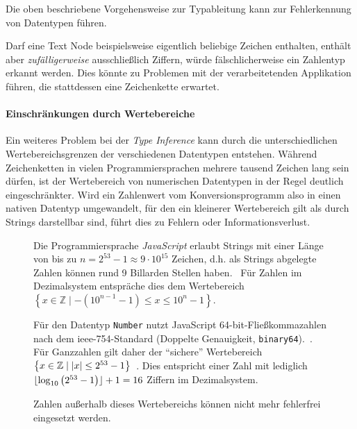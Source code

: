 Die oben beschriebene Vorgehensweise zur Typableitung kann zur Fehlerkennung von Datentypen führen.

Darf eine Text Node beispielsweise eigentlich beliebige Zeichen enthalten, enthält aber \emph{zufälligerweise} ausschließlich Ziffern, würde fälschlicherweise ein Zahlentyp erkannt werden. Dies könnte zu Problemen mit der verarbeitetenden Applikation führen, die stattdessen eine Zeichenkette erwartet.

\paragraph{Einschränkungen durch Wertebereiche}

Ein weiteres Problem bei der \emph{Type Inference} kann durch die unterschiedlichen Wertebereichsgrenzen der verschiedenen Datentypen entstehen.  Während Zeichenketten in vielen Programmiersprachen mehrere tausend Zeichen lang sein dürfen, ist der Wertebereich von numerischen Datentypen in der Regel deutlich eingeschränkter. Wird ein Zahlenwert vom Konversionsprogramm also in einen nativen Datentyp umgewandelt, für den ein kleinerer Wertebereich gilt als durch Strings darstellbar sind, führt dies zu Fehlern oder Informationsverlust.

\begin{figure}[t!]
\begin{example}

    Die Programmiersprache \emph{JavaScript} erlaubt Strings mit einer Länge von bis zu $n=2^{53}-1 \approx 9 \cdot 10^{15}$ Zeichen, d.h. als Strings abgelegte Zahlen können rund 9 Billarden Stellen haben.~\cite[Abschnitt 6.1.4]{ecma262} Für Zahlen im Dezimalsystem entspräche dies dem Wertebereich $\left\{x \in \mathbb{Z} \mid -\left(10^{n-1}-1\right) \leq x \leq 10^{n}-1\right\}$.

    Für den Datentyp \texttt{Number} nutzt JavaScript 64-bit-Fließkommazahlen nach dem \acrshort{ieee}-754-Standard (Doppelte Genauigkeit, \texttt{binary64}).~\cite[Abschnitt 4.3.20]{ieee754,ecma262}. Für Ganzzahlen gilt daher der \enquote{sichere} Wertebereich $\left\{x \in \mathbb{Z} \mid \lvert x\rvert \leq 2^{53}-1\right\}$~\cite[Abschnitt 20.1.2.5]{ecma262}. Dies entspricht einer Zahl mit lediglich $\lfloor\log_{10}\left(2^{53}-1\right)\rfloor+1 = 16$ Ziffern im Dezimalsystem.

    Zahlen außerhalb dieses Wertebereichs können nicht mehr fehlerfrei eingesetzt werden.

    \inputminted[firstline=2,firstnumber=1,mathescape]{javascript}{typeinference.js}
\end{example}
\end{figure}

